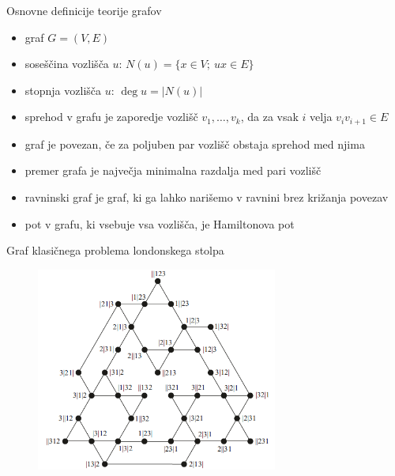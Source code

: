 \documentclass{beamer}
\DeclareMathOperator {\stopnja} {deg}
\begin{document}
\begin{frame}{Osnovne definicije teorije grafov}
    \begin{itemize}
        \item graf $ G = (V, E) $
        \item \alert{soseščina} vozlišča $u$: $N(u) = \{x \in V;\ ux \in E\}$
        \item \alert{stopnja} vozlišča $u$: $\stopnja u  = \lvert N(u) \rvert$
        \item \alert{sprehod} v grafu je zaporedje vozlišč $v_1,\ldots, v_k$, da za vsak $i$ velja $v_i v_{i+1} \in E$
        \item graf je \alert{povezan}, če za poljuben par vozlišč obstaja sprehod med njima
        \item \alert{premer} grafa je največja minimalna razdalja med pari vozlišč
    \end{itemize}
\end{frame}

\begin{frame}
    \begin{itemize}
        \item \alert{ravninski} graf je graf, ki ga lahko narišemo v ravnini brez križanja povezav
        \item pot v grafu, ki vsebuje vsa vozlišča, je \alert{Hamiltonova pot}
    \end{itemize}
\end{frame}

\begin{frame}{Graf klasičnega problema londonskega stolpa}
    
    \begin{figure}
        \centering
        \includegraphics[height=190pt]{img/tolgraph.png}
    \end{figure}
\end{frame}
\end{document}
